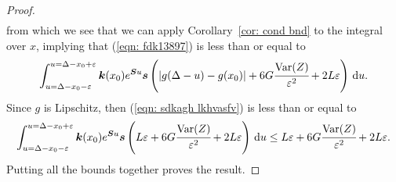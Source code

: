 \begin{proof}
\begin{align}
	\end{align}
	from which we see that we can apply Corollary~\ref{cor: cond bnd} to the integral over \(x\), implying that (\ref{eqn: fdk13897}) is less than or equal to
	\begin{align}
		\int_{u=\Delta-x_0-\varepsilon}^{u=\Delta-x_0+\varepsilon} \boldsymbol k(x_0) e^{\boldsymbol Su}\boldsymbol s\left(|g(\Delta-u)-g(x_0)|+6G\cfrac{\mathrm{Var}(Z)}{\varepsilon^2} + 2 L \varepsilon\right)\, \mathrm{d} u. \label{eqn: sdkagh lkhvasfv}
	\end{align}
	Since \(g\) is Lipschitz, then (\ref{eqn: sdkagh lkhvasfv}) is less than or equal to 
	\begin{align}
		\int_{u=\Delta-x_0-\varepsilon}^{u=\Delta-x_0+\varepsilon} \boldsymbol k(x_0) e^{\boldsymbol Su}\boldsymbol s\left(L\varepsilon+6G\cfrac{\mathrm{Var}(Z)}{\varepsilon^2} + 2 L \varepsilon\right)\, \mathrm{d} u \leq L\varepsilon+6G\cfrac{\mathrm{Var}(Z)}{\varepsilon^2} + 2 L \varepsilon. \label{eqn: sdkagh lsfv}
	\end{align}
	Putting all the bounds together proves the result. 
\end{proof}

